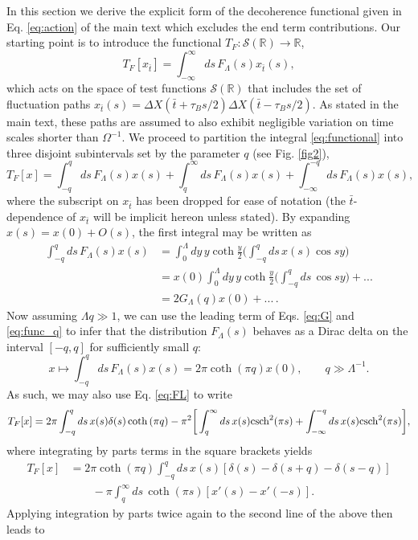\documentclass[prl,twocolumn,superscriptaddress,amsmath,amssymb]{revtex4-2}
\def\be{\begin{equation}}
\def\ee{\end{equation}}
\newcommand{\tb}{\bar{t}}
\newcommand{\csh}{{\rm csch}}
\begin{document}
In this section we derive the explicit form of the decoherence functional given in Eq. \eqref{eq:action} of the main text which excludes the end term contributions. Our starting point is to introduce the functional $T_F:\mathcal{S}(\mathbb{R})\rightarrow\mathbb{R}$,
\be\label{eq:functional}
T_F[x_{\tb}] = \int^{\infty}_{-\infty}ds\,F_{\Lambda}(s)x_{\tb}(s),
\ee
which acts on the space of test functions $\mathcal{S}(\mathbb{R})$ that includes the set of fluctuation paths $x_{\tb}(s)=\Delta X(\tb+\tau_Bs/2)\Delta X(\tb - \tau_Bs/2)$. As stated in the main text, these paths are assumed to also exhibit negligible variation on time scales shorter than $\Omega^{-1}$. We proceed to partition the integral \eqref{eq:functional} into three disjoint subintervals set by the parameter $q$ (see Fig. \ref{fig2}),
\be\label{eq:functional_supp}
T_F[x] = \int^{q}_{-q}ds\,F_{\Lambda}(s)x(s) + \int^{\infty}_qds\,F_{\Lambda}(s)x(s) + \int^{-q}_{-\infty}ds\,F_{\Lambda}(s)x(s),
\ee
where the subscript on $x_{\tb}$ has been dropped for ease of notation (the $\tb$-dependence of $x_{\tb}$ will be implicit hereon unless stated). By expanding $x(s)=x(0)+O(s)$, the first integral may be written as
\begin{align}\label{eq:func_q}
    \int^q_{-q}ds\,F_{\Lambda}(s)x(s) &= \int^{\Lambda}_0dy\,y\coth\frac{y}{2}\bigg(\int^{q}_{-q}ds\,x(s)\cos{sy}\bigg) \nonumber\\
    &= x(0)\int^{\Lambda}_0dy\,y\coth\frac{y}{2}\bigg(\int^q_{-q}ds\,\cos{sy}\bigg) + ... \nonumber\\
    &= 2G_{\Lambda}(q)x(0) + ... \, .
\end{align}
Now assuming $\Lambda q\gg1$, we can use the leading term of Eqs. \eqref{eq:G} and \eqref{eq:func_q} to infer that the distribution $F_{\Lambda}(s)$ behaves as a Dirac delta on the interval $[-q,q]$ for sufficiently small $q$:
\[
    x\mapsto \int^q_{-q}ds\,F_{\Lambda}(s)x(s)= 2\pi\coth{(\pi q)}x(0),\qquad q\gg\Lambda^{-1}.
\]
As such, we may also use Eq. \eqref{eq:FL} to write 
\be
    T_F[x] = 2\pi\int^q_{-q}ds\,x(s)\delta(s)\coth{(\pi q)} - \pi^2\bigg[\int^{\infty}_qds\,x(s)\csh^2{(\pi s)} + \int^{-q}_{-\infty}ds\,x(s)\csh^2{(\pi s)}\bigg], 
\ee
where integrating by parts terms in the square brackets yields
\begin{align}
    T_F[x] &= 2\pi\coth{(\pi q)}\int^q_{-q}ds\,x(s)[\delta(s) - \delta(s+q) - \delta(s-q)] \nonumber\\
    &\qquad - \pi\int^{\infty}_qds\,\coth{(\pi s)}[x'(s) - x'(-s)].
\end{align}
Applying integration by parts twice again to the second line of the above then leads to
\end{document}

